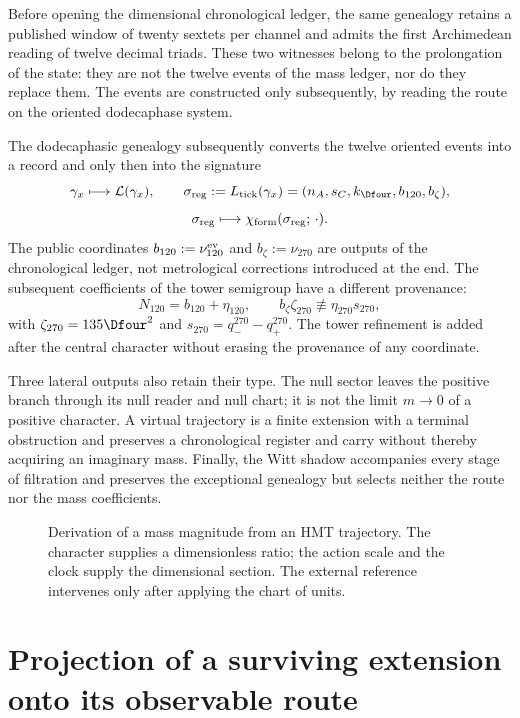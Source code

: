 Before opening the dimensional chronological ledger, the same genealogy retains a
published window of twenty sextets per channel and admits the first
Archimedean reading of twelve decimal triads. These two witnesses belong to the
prolongation of the state: they are not the twelve events of the mass ledger, nor do they
replace them. The events are constructed only subsequently, by reading the route on the
oriented dodecaphase system.

The dodecaphasic genealogy subsequently converts the twelve oriented events into a
record and only then into the signature
\[
 \gamma_x\longmapsto\mathcal L(\gamma_x),\qquad
 \sigma_{\rm reg}:=L_{\rm tick}(\gamma_x)
 =(n_A,s_C,k_{\Dfour},b_{120},b_{\zeta}),
\]
\[
 \sigma_{\rm reg}\longmapsto
 \chi_{\rm form}(\sigma_{\rm reg};\,\cdot).
\]
The public coordinates \(b_{120}:=\nu_{120}^{\rm ev}\) and
\(b_{\zeta}:=\nu_{270}\) are outputs of the chronological ledger, not metrological
corrections introduced at the end. The subsequent coefficients of the
tower semigroup have a different provenance:
\[
 N_{120}=b_{120}+\eta_{120},\qquad
 b_{\zeta}\zeta_{270}\not\equiv\eta_{270}s_{270},
\]
with \(\zeta_{270}=135\Dfour^2\) and
\(s_{270}=q_-^{270}-q_+^{270}\). The tower refinement is added after
the central character without erasing the provenance of any coordinate.

Three lateral outputs also retain their type. The null sector leaves the positive branch through its null reader and null chart; it is not the limit \(m\to0\) of a positive character. A virtual trajectory is a finite extension with a terminal obstruction and preserves a chronological register and carry without thereby acquiring an imaginary mass. Finally, the Witt shadow accompanies every stage of filtration and preserves the exceptional genealogy but selects neither the route nor the mass coefficients.

\begin{figure}[p]
\centering

\caption{Derivation of a mass magnitude from an HMT trajectory.
The character supplies a dimensionless ratio; the action scale and the clock
supply the dimensional section. The external reference intervenes only after
applying the chart of units.}
\label{fig:derivacion-masa-rev9}
\end{figure}

\section{Projection of a surviving extension onto its observable route}

